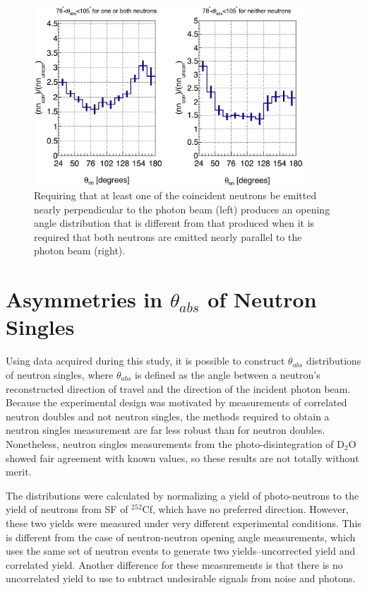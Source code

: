 \begin{figure}
\centering
\includegraphics[width=0.9\textwidth]{Content/Results/theta_abs_two-neutron.png}
\caption{Requiring that at least one of the coincident neutrons be emitted nearly perpendicular to the photon beam (left) produces an opening angle distribution that is different from that produced when it is required that both neutrons are emitted nearly parallel to the photon beam (right).}
\label{fig:theta_abs_two_neutron}
\end{figure}
\FloatBarrier 

\section{Asymmetries in $\theta_{abs}$ of Neutron Singles}
Using data acquired during this study, it is possible to construct $\theta_{abs}$ distributions of neutron singles, where $\theta_{abs}$ is defined as the angle between a neutron's reconstructed direction of travel and the direction of the incident photon beam.
Because the experimental design was motivated by measurements of correlated neutron doubles and not neutron singles, the methods required to obtain a neutron singles measurement are far less robust than for neutron doubles.
Nonetheless, neutron singles measurements from the photo-disintegration of D$_{2}$O showed fair agreement with known values, so these results are not totally without merit.

The distributions were calculated by normalizing a yield of photo-neutrons to the yield of neutrons from SF of $^{252}$Cf, which have no preferred direction.
However, these two yields were measured under very different experimental conditions.
This is different from the case of neutron-neutron opening angle measurements, which uses the same set of neutron events to generate two yields--uncorrected yield and correlated yield.
Another difference for these measurements is that there is no uncorrelated yield to use to subtract undesirable signals from noise and photons.

